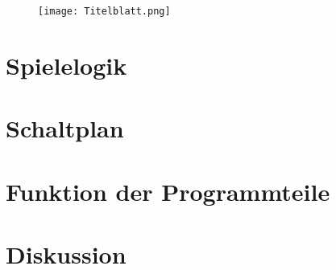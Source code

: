 \documentclass{article}
\begin{document}
    \begin{figure}[h!] %
		\texttt{[image: Titelblatt.png]}
	\end{figure}
    

    \section{Spielelogik}
    \section{Schaltplan}    %
    \section{Funktion der Programmteile} %
    \section{Diskussion}
    
    
    
\end{document}
